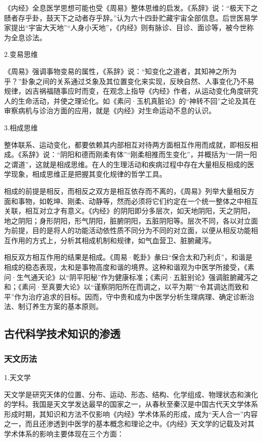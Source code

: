 \documentclass[draft,12pt]{ctexbook}
\begin{document}
《内经》全息医学思想可能也受《周易》整体思维的启发。《系辞》说：“极天下之赜者存乎卦，鼓天下之动者存乎辞。”认为六十四卦贮藏宇宙全部信息。后世医易学家提出“宇宙大天地”“人身小天地”，《内经》则有脉诊、目诊、面诊等，被今世称为全息诊法。

2.变易思维

《周易》强调事物变易的属性，《系辞》说：“知变化之道者，其知神之所为乎？”卦象之间的关系通过爻象及其位置变化来实现，反映自然、人事变化乃不易规律，凶吉祸福随事应时而变，在观念上指导《内经》作者，从运动变化角度研究人的生命活动，并使之理论化。如《素问·玉机真脏论》的“神转不回”之论及其在审察病机与诊治方面的应用，就是《内经》对生命运动不息的认识。

3.相成思维

整体联系、运动变化，都要依赖其内部相互对待两方面相互作用而成就，即相反相成。《系辞》说：“阴阳和德而刚柔有体”“刚柔相推而生变化”，并概括为“一阴一阳之谓道”，这就是相成思维。在人的生理活动和疾病过程中存在大量相反相成的医学现象，相成思维正是把握其变化规律的哲学工具。

相成的前提是相反，而相反之双方是相互依存而不离的，《周易》列举大量相反方面和事物，如乾坤、刚柔、动静等，然而必须将它们约定在一个统一整体之中相互关联，相互对立才有意义。《内经》的阴阳即分多层次，如天地阴阳，天之阴阳，地之阴阳；身形阴阳，形气阴阳，脏腑阴阳，五脏阴阳等。层次不同，各以对立面为前提，目的是将人的功能活动依性质不同分为不同的对立面，以便从相反功能相互作用的方式上，分析其相成机制和规律，如气血营卫、脏腑藏泻。

相反双方相互作用的结果是相成。《周易·乾卦》彖曰“保合太和乃利贞”，和谐是相成的稳态表现，太和是事物高度和谐的境界。这种和谐观为中医学所接受，《素问·生气通天论》以“阴平阳秘”作为健康标准；《素问·五脏别论》强调脏腑藏泻之和；《素问·至真要大论》以“谨察阴阳所在而调之，以平为期”“令其调达而致和平”作为治疗追求的目标。因而，守中贵和成为中医学分析生理病理、确定诊断治法、制订养生方案的基本原则。

\subsection{古代科学技术知识的渗透} %

\subsubsection{天文历法}%

1.天文学

天文学是研究天体的位置、分布、运动、形态、结构、化学组成、物理状态和演化的学科。我国是天文学发达最早的国家之一，从春秋至秦汉是中国古代天文学体系形成时期，其知识和方法不仅影响《内经》学术体系的形成，成为“天人合一”内容之一，而且还渗透到中医学的基本概念和理论之中。《内经》天文学的记载及对其学术体系的影响主要体现在三个方面：
\end{document}
